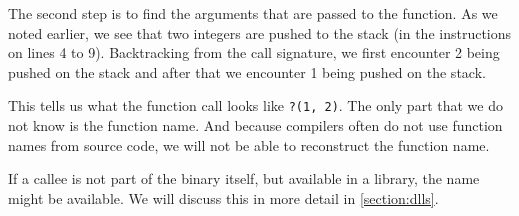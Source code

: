 The second step is to find the arguments that are passed to the function. As we noted earlier, we see that two integers are pushed to the stack (in the instructions on lines 4 to 9). Backtracking from the call signature, we first encounter 2 being pushed on the stack and after that we encounter 1 being pushed on the stack.

This tells us what the function call looks like \texttt{?(1, 2)}. The only part that we do not know is the function name. And because compilers often do not use function names from source code, we will not be able to reconstruct the function name.

If a callee is not part of the binary itself, but available in a library, the name might be available. We will discuss this in more detail in \autoref{section:dlls}.
